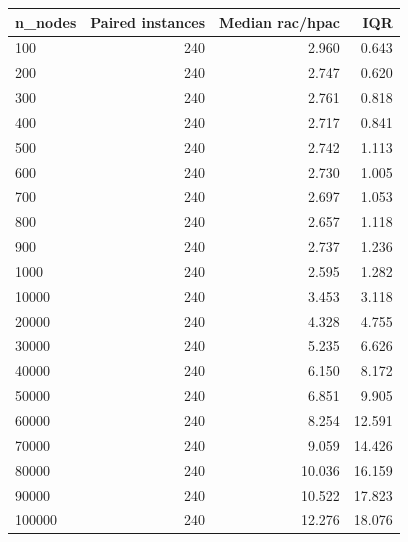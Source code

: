 \begin{tabular}{lrrr}
\toprule
n\_nodes & Paired instances & Median rac/hpac & IQR \\
\midrule
100 & 240 & 2.960 & 0.643 \\
200 & 240 & 2.747 & 0.620 \\
300 & 240 & 2.761 & 0.818 \\
400 & 240 & 2.717 & 0.841 \\
500 & 240 & 2.742 & 1.113 \\
600 & 240 & 2.730 & 1.005 \\
700 & 240 & 2.697 & 1.053 \\
800 & 240 & 2.657 & 1.118 \\
900 & 240 & 2.737 & 1.236 \\
1000 & 240 & 2.595 & 1.282 \\
10000 & 240 & 3.453 & 3.118 \\
20000 & 240 & 4.328 & 4.755 \\
30000 & 240 & 5.235 & 6.626 \\
40000 & 240 & 6.150 & 8.172 \\
50000 & 240 & 6.851 & 9.905 \\
60000 & 240 & 8.254 & 12.591 \\
70000 & 240 & 9.059 & 14.426 \\
80000 & 240 & 10.036 & 16.159 \\
90000 & 240 & 10.522 & 17.823 \\
100000 & 240 & 12.276 & 18.076 \\
\bottomrule
\end{tabular}

